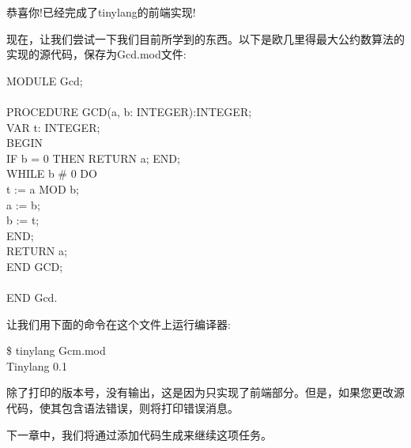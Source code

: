 恭喜你!已经完成了tinylang的前端实现!\par

现在，让我们尝试一下我们目前所学到的东西。以下是欧几里得最大公约数算法的实现的源代码，保存为Gcd.mod文件:\par

\begin{tcolorbox}[colback=white,colframe=black]
MODULE Gcd; \\
\\
PROCEDURE GCD(a, b: INTEGER):INTEGER; \\
VAR t: INTEGER; \\
BEGIN \\
\hspace*{0.5cm}IF b = 0 THEN RETURN a; END; \\
\hspace*{1cm}WHILE b \# 0 DO \\
\hspace*{1.5cm}t := a MOD b; \\
\hspace*{1.5cm}a := b; \\
\hspace*{1.5cm}b := t; \\
\hspace*{1cm}END; \\
\hspace*{1cm}RETURN a; \\
END GCD; \\
\\
END Gcd.
\end{tcolorbox}

让我们用下面的命令在这个文件上运行编译器:\par

\begin{tcolorbox}[colback=white,colframe=black]
\$ tinylang Gcm.mod \\
Tinylang 0.1
\end{tcolorbox}

除了打印的版本号，没有输出，这是因为只实现了前端部分。但是，如果您更改源代码，使其包含语法错误，则将打印错误消息。\par

下一章中，我们将通过添加代码生成来继续这项任务。\par

















